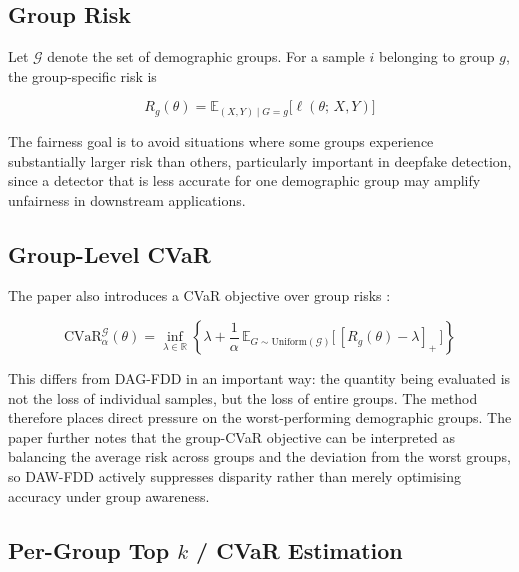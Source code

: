 \subsection{Group Risk}
\label{subsec:daw_group_risk}

Let $\mathcal{G}$ denote the set of demographic groups. For a sample $i$ belonging to group $g$, the group-specific risk is

\begin{equation}
    R_g(\theta)
    = \mathbb{E}_{(X,Y)\mid G=g}\bigl[\ell(\theta;\,X,Y)\bigr]
    \label{eq:group_risk}
\end{equation}

\noindent The fairness goal is to avoid situations where some groups experience substantially larger risk than others, particularly important in deepfake detection, since a detector that is less accurate for one demographic group may amplify unfairness in downstream applications.

\subsection{Group-Level CVaR}
\label{subsec:daw_group_cvar}

The paper also introduces a CVaR objective over group risks \cite{dag_paper}:

\begin{equation}
    \mathrm{CVaR}_{\alpha}^{\mathcal{G}}(\theta)
    = \inf_{\lambda \in \mathbb{R}}
      \left\{
        \lambda
        + \frac{1}{\alpha}\,
          \mathbb{E}_{G \sim \mathrm{Uniform}(\mathcal{G})}
          \bigl[\,[R_g(\theta) - \lambda]_{+}\,\bigr]
      \right\}
    \label{eq:group_cvar}
\end{equation}

\noindent This differs from DAG-FDD in an important way: the quantity being evaluated is not the loss of individual samples, but the loss of entire groups. The method therefore places direct pressure on the worst-performing demographic groups. The paper further notes that the group-CVaR objective can be interpreted as balancing the average risk across groups and the deviation from the worst groups, so DAW-FDD actively suppresses disparity rather than merely optimising accuracy under group awareness.

\subsection{Per-Group Top \texorpdfstring{$k$}{k} / CVaR Estimation}
\label{sec:per_group_topk}

